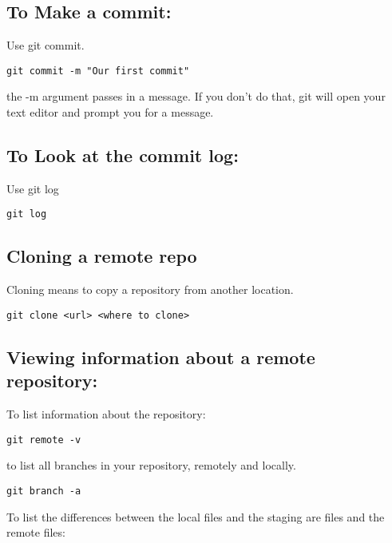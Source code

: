 \subsection{To Make a commit:}\label{to-make-a-commit}

Use git commit.

\begin{verbatim}
git commit -m "Our first commit"
\end{verbatim}

the -m argument passes in a message. If you don't do that, git will open
your text editor and prompt you for a message.

\subsection{To Look at the commit log:}\label{to-look-at-the-commit-log}

Use git log

\begin{verbatim}
git log 
\end{verbatim}

\subsection{Cloning a remote repo}\label{cloning-a-remote-repo}

Cloning means to copy a repository from another location.

\begin{verbatim}
git clone <url> <where to clone>
\end{verbatim}

\subsection{Viewing information about a remote
repository:}\label{viewing-information-about-a-remote-repository}

To list information about the repository:

\begin{verbatim}
git remote -v
\end{verbatim}

to list all branches in your repository, remotely and locally.

\begin{verbatim}
git branch -a
\end{verbatim}

To list the differences between the local files and the staging are
files and the remote files:

